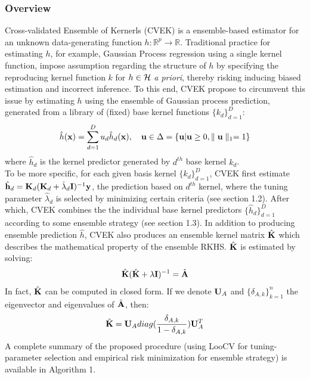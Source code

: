 \documentclass[11pt]{article}
\begin{document}
\subsubsection{{Overview}}
Cross-validated Ensemble of Kernerls (CVEK) \citep{liu_robust_2017} is a ensemble-based estimator for an unknown data-generating function $h: \mathbb{R}^p\rightarrow \mathbb{R}$. Traditional practice for estimating $h$, for example, Gaussian Process regression using a single kernel function, impose assumption regarding the structure of $h$ by specifying the reproducing kernel function $k$ for $h \in {\cal H}$ \textit{a priori}, thereby risking inducing biased estimation and incorrect inference. To this end, CVEK propose to circumvent this issue by  estimating $h$ using the ensemble of Gaussian process prediction, generated from a library of (fixed) base kernel functions $\{k_d\}_{d=1}^D$:
\begin{align}
\hat{h}({\bf x})=\sum_{d=1}^D u_d\hat{h}_d({\bf x}), \quad {\bf u} \in \Delta=\{{\bf u} | {\bf u} \geq 0, \parallel {\bf u} \parallel_1=1\}
\end{align}
where $\hat{h}_d$ is the kernel predictor generated by $d^{th}$ base kernel $k_d$.\\
To be more specific, for each given basis kernel $\{k_d\}_{d=1}^D$, CVEK first estimate $\hat{{\bf h}}_d={\bf K}_d({\bf K}_d+\hat{\lambda}_d{\bf I})^{-1}{\bf y}$, the prediction based on $d^{th}$ kernel, where the tuning parameter $\hat{\lambda}_d$ is selected by minimizing certain criteria (see section 1.2). After which, CVEK combines the the individual base kernel predictors $\{\hat{h}_d\}_{d=1}^D$ according to some ensemble strategy (see section 1.3). In addition to producing ensemble prediction $\hat{h}$, CVEK also produces an ensemble kernel matrix $\hat{{\bf K}}$ which describes the mathematical property of the ensemble RKHS. $\hat{{\bf K}}$ is estimated by solving:
\begin{align*}
\hat{{\bf K}}(\hat{{\bf K}}+\lambda {\bf I})^{-1}=\hat{{\bf A}}
\end{align*}
In fact, $\hat{{\bf K}}$ can be computed in closed form. If we denote ${\bf U}_A$ and $\{\delta_{A,k}\}_{k=1}^n$ the eigenvector and eigenvalues of $\hat{{\bf A}}$, then:
\begin{align*}
\hat{{\bf K}}={\bf U}_A diag(\frac{\delta_{A,k}}{1-\delta_{A,k}}){\bf U}_A^T
\end{align*}
A complete summary of the proposed procedure (using LooCV for tuning-parameter selection and empirical risk minimization for ensemble strategy) is available in Algorithm 1.
\end{document}

